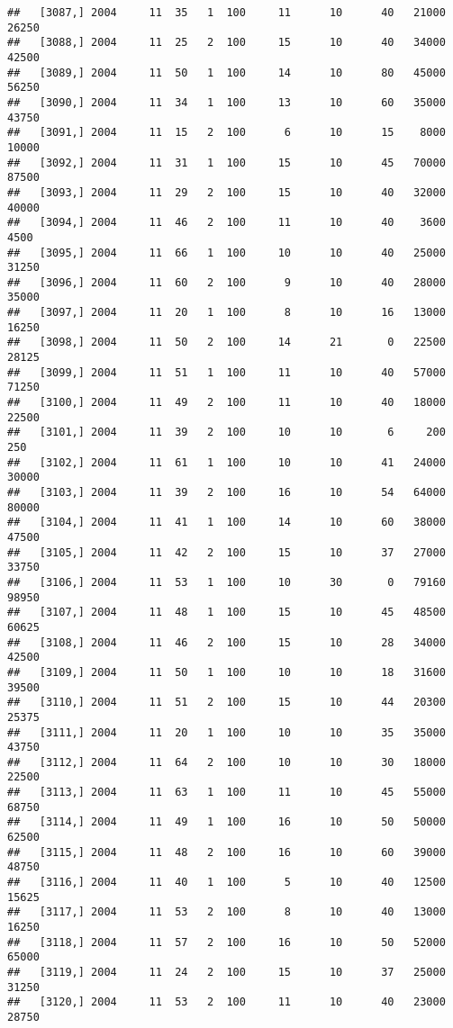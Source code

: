\documentclass{article}\usepackage[]{graphicx}\usepackage[]{color}
\makeatletter
\newenvironment{kframe}{%
 \def\at@end@of@kframe{}%
 \ifinner\ifhmode%
  \def\at@end@of@kframe{\end{minipage}}%
  \begin{minipage}{\columnwidth}%
 \fi\fi%
 \def\FrameCommand##1{\hskip\@totalleftmargin \hskip-\fboxsep
 \colorbox{shadecolor}{##1}\hskip-\fboxsep
     \hskip-\linewidth \hskip-\@totalleftmargin \hskip\columnwidth}%
 \MakeFramed {\advance\hsize-\width
   \@totalleftmargin\z@ \linewidth\hsize
   \@setminipage}}%
 {\par\unskip\endMakeFramed%
 \at@end@of@kframe}
\newenvironment{knitrout}{}{} %
\makeatother
\begin{document}
\begin{knitrout}
\begin{kframe}
\begin{verbatim}
##   [3087,] 2004     11  35   1  100     11      10      40   21000   26250
##   [3088,] 2004     11  25   2  100     15      10      40   34000   42500
##   [3089,] 2004     11  50   1  100     14      10      80   45000   56250
##   [3090,] 2004     11  34   1  100     13      10      60   35000   43750
##   [3091,] 2004     11  15   2  100      6      10      15    8000   10000
##   [3092,] 2004     11  31   1  100     15      10      45   70000   87500
##   [3093,] 2004     11  29   2  100     15      10      40   32000   40000
##   [3094,] 2004     11  46   2  100     11      10      40    3600    4500
##   [3095,] 2004     11  66   1  100     10      10      40   25000   31250
##   [3096,] 2004     11  60   2  100      9      10      40   28000   35000
##   [3097,] 2004     11  20   1  100      8      10      16   13000   16250
##   [3098,] 2004     11  50   2  100     14      21       0   22500   28125
##   [3099,] 2004     11  51   1  100     11      10      40   57000   71250
##   [3100,] 2004     11  49   2  100     11      10      40   18000   22500
##   [3101,] 2004     11  39   2  100     10      10       6     200     250
##   [3102,] 2004     11  61   1  100     10      10      41   24000   30000
##   [3103,] 2004     11  39   2  100     16      10      54   64000   80000
##   [3104,] 2004     11  41   1  100     14      10      60   38000   47500
##   [3105,] 2004     11  42   2  100     15      10      37   27000   33750
##   [3106,] 2004     11  53   1  100     10      30       0   79160   98950
##   [3107,] 2004     11  48   1  100     15      10      45   48500   60625
##   [3108,] 2004     11  46   2  100     15      10      28   34000   42500
##   [3109,] 2004     11  50   1  100     10      10      18   31600   39500
##   [3110,] 2004     11  51   2  100     15      10      44   20300   25375
##   [3111,] 2004     11  20   1  100     10      10      35   35000   43750
##   [3112,] 2004     11  64   2  100     10      10      30   18000   22500
##   [3113,] 2004     11  63   1  100     11      10      45   55000   68750
##   [3114,] 2004     11  49   1  100     16      10      50   50000   62500
##   [3115,] 2004     11  48   2  100     16      10      60   39000   48750
##   [3116,] 2004     11  40   1  100      5      10      40   12500   15625
##   [3117,] 2004     11  53   2  100      8      10      40   13000   16250
##   [3118,] 2004     11  57   2  100     16      10      50   52000   65000
##   [3119,] 2004     11  24   2  100     15      10      37   25000   31250
##   [3120,] 2004     11  53   2  100     11      10      40   23000   28750

\end{verbatim}
\end{kframe}
\end{knitrout}
\end{document}

